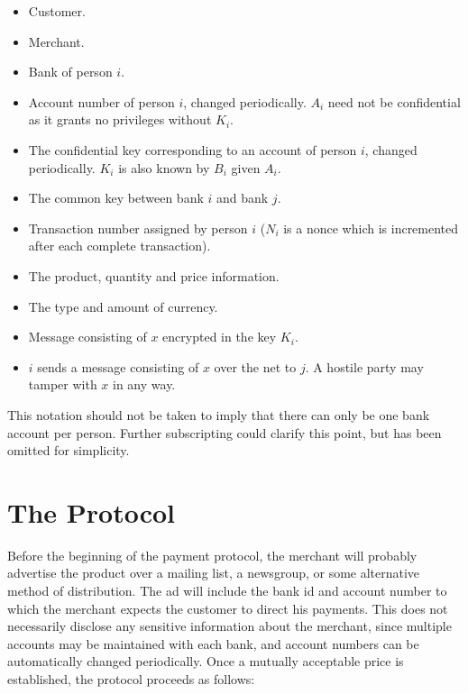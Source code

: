 \begin{itemize}
\item {} Customer.
\item {} \parbox{3in}{Merchant.}
\item {} Bank of person $i$.
\item {} \parbox[t]{4.1in}{Account
	number of person $i$, changed periodically.  $A_{i}$ need not be
	confidential as it grants no privileges	without $K_{i}$.}
\item {} \parbox[t]{4.1in}{The confidential key corresponding
 to an account of person $i$, changed periodically.
		$K_{i}$ is also known by $B_{i}$ given $A_{i}$.}
\item {} \parbox[t]{4.1in}{The common
		key between bank $i$ and bank $j$.}
\item {} \parbox[t]{4.1in}{Transaction number assigned by person $i$
	($N_{i}$ is a nonce which is incremented after each complete transaction).}
\item {} \parbox[t]{4.1in}{The product, quantity and price information.}
\item \makebox[.85in][l]{\$} The type and amount of currency.
\item {} Message consisting of $x$ encrypted in the key $K_{i}$.
\item {} \parbox[t]{4.1in}{$i$ sends a message
		consisting of $x$ over the net to $j$. A hostile party
		may tamper with $x$ in any way.}

\end{itemize}

This notation should not be taken to imply that there can only be one
bank account per person.  Further subscripting could clarify this
point, but has been omitted for simplicity.

\section{The Protocol}

Before the beginning of the payment protocol, the merchant will probably
advertise the product over a mailing list, a newsgroup, or some
alternative method of distribution.  The ad will include the bank id and
account number to which the merchant expects the customer to direct his
payments.  This does not necessarily disclose any sensitive information
about the merchant, since multiple accounts may be maintained with each
bank, and account numbers can be automatically changed periodically.  Once
a mutually acceptable price is established, the protocol proceeds as
follows:

